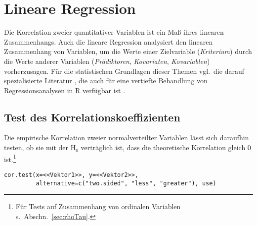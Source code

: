\chapter{Lineare Regression}
\label{sec:regression}

Die Korrelation zweier quantitativer Variablen ist ein Maß ihres linearen Zusammenhangs. Auch die lineare Regression analysiert den linearen Zusammenhang von Variablen, um die Werte einer Zielvariable (\emph{Kriterium}) durch die Werte anderer Variablen (\emph{Prädiktoren}, \emph{Kovariaten}, \emph{Kovariablen}) vorherzusagen. Für die statistischen Grundlagen dieser Themen vgl.\ die darauf spezialisierte Literatur \cite{Eid2010}, die auch für eine vertiefte Behandlung von Regressionsanalysen in R verfügbar ist \cite{Faraway2004, Fox2002}.

\section{Test des Korrelationskoeffizienten}
\label{sec:corTest}

Die empirische Korrelation zweier normalverteilter Variablen lässt sich daraufhin testen, ob sie mit der $\text{H}_{0}$ verträglich ist, dass die theoretische Korrelation gleich $0$ ist.\footnote{Für Tests auf Zusammenhang von ordinalen Variablen s.\ Abschn.\ \ref{sec:rhoTau}.}
\begin{lstlisting}
cor.test(x=<<Vektor1>>, y=<<Vektor2>>,
         alternative=c("two.sided", "less", "greater"), use)
\end{lstlisting}

